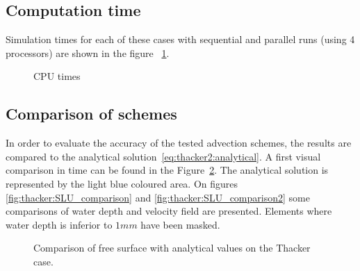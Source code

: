 \subsection{Computation time}

Simulation times for each of these cases with sequential and parallel runs (using 4 processors) are shown in the figure ~\ref{fig:thacker2:cputime}.

\begin{figure}[h!]
  \centering
  \caption{CPU times}\label{fig:thacker2:cputime}
\end{figure}

\subsection{Comparison of schemes}

In order to evaluate the accuracy of the tested advection schemes, the results are compared to the analytical solution~\ref{eq:thacker2:analytical}.
A first visual comparison in time can be found in the Figure~\ref{fig:thacker2:SLTime}.
The analytical solution is represented by the light blue coloured area.
On figures \ref{fig:thacker:SLU_comparison} and \ref{fig:thacker:SLU_comparison2}
some comparisons of water depth and velocity field are presented. Elements where water depth is inferior to $1mm$ have been masked.

\begin{figure}[H]
\begin{minipage}[t]{0.5\textwidth}
 \centering
\end{minipage}%
\begin{minipage}[t]{0.5\textwidth}
 \centering
\end{minipage}
\begin{minipage}[t]{0.5\textwidth}
 \centering
\end{minipage}%
\begin{minipage}[t]{0.5\textwidth}
 \centering
\end{minipage}
  \caption{Comparison of free surface with analytical values on the Thacker case.}
  \label{fig:thacker2:SLTime}
\end{figure}

